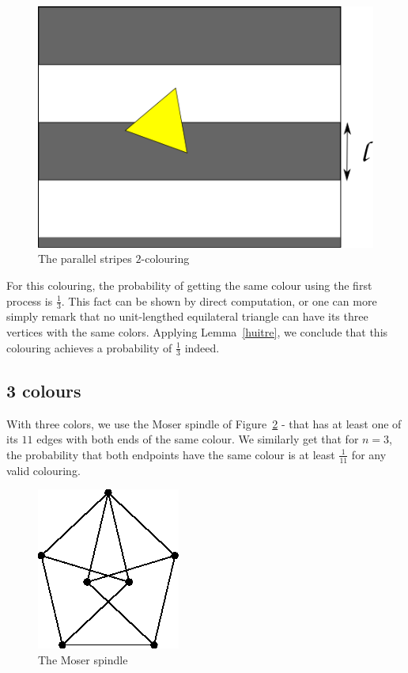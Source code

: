 \documentclass[a4paper,11pt]{article}
\theoremstyle{definition}
\theoremstyle{remark}
\begin{document}
\begin{figure}[h]
\center
\includegraphics[scale=0.5]{path6509.png}
\caption{\label{couleur} The parallel stripes $2$-colouring}
\end{figure}

For this colouring, the probability of getting the same colour using the first 
process is $\frac13$. This fact can be shown by direct computation, or one can 
more simply remark that no unit-lengthed equilateral triangle can have its 
three vertices with the same colors. Applying Lemma~\ref{huitre}, we conclude 
that this colouring achieves a probability of $\frac{1}{3}$ indeed.

\subsection{3 colours}
 With three colors, we use the Moser spindle of Figure~\ref{color} - that 
 has at least one of its $11$ edges with both ends of the same colour.
 We similarly get that for $n=3$, the probability that both endpoints have the 
 same colour is at least 
 $\frac{1}{11}$ for any valid colouring. 

\begin{figure}[h]
\center
\includegraphics[scale=0.4]{T.png}
\caption{\label{color} The Moser spindle}
\end{figure}
\end{document}
